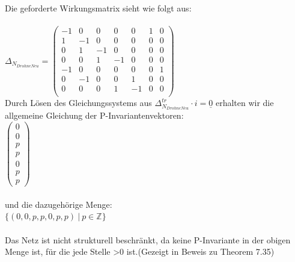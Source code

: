 \documentclass[a4paper,12pt]{scrartcl}
\begin{document}
\subsubsection{}
\subsubsection{}
Die geforderte Wirkungsmatrix sieht wie folgt aus:\\\\
$
\Delta_{N_{DrohneNeu}} =
\begin{pmatrix}
-1 & 0 & 0 & 0 & 0 & 1 & 0\\
1 & -1 & 0 & 0 & 0 & 0 & 0\\
0 & 1 & -1 & 0 & 0 & 0 & 0\\
0 & 0 & 1 & -1 & 0 & 0 & 0\\
-1 & 0 & 0 & 0 & 0 & 0 & 1\\
0 & -1 & 0 & 0 & 1 & 0 & 0\\
0 & 0 & 0 & 1 & -1 & 0 & 0\\
\end{pmatrix}
$\\
Durch Lösen des Gleichungssystems aus $\Delta_{N_{DrohneNeu}}^{tr} \cdot i = \underline{0}$ erhalten wir die allgemeine Gleichung der P-Invariantenvektoren:\\
$
\begin{pmatrix}
0\\
0\\
p\\
p\\
0\\
p\\
p
\end{pmatrix}$\\\\
und die dazugehörige Menge:\\
$\{(0,0,p,p,0,p,p)\ |\ p \in \mathbb{Z}\}
$\\\\
Das Netz ist nicht strukturell beschränkt, da keine P-Invariante in der obigen Menge ist, für die jede Stelle >0 ist.(Gezeigt in Beweis zu Theorem 7.35)
\end{document}
